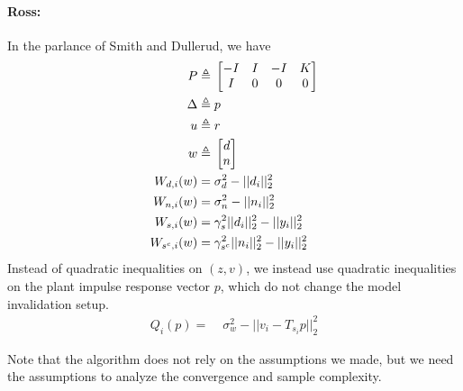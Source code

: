 \documentclass[11pt, onecolumn]{article}
\newcommand{\rb}[1]{{\color{red}{Ross: #1}}}
\begin{document}
\paragraph{Ross:}


\rb{I forget which covariance constraint things we came up with}
In the parlance of Smith and Dullerud, we have
\begin{align*}
P \triangleq &\; \begin{bmatrix}-I & I & -I & K\\I & 0 & 0 & 0\end{bmatrix}\\
\Delta \triangleq &\; p \\
u \triangleq &\; r \\
w \triangleq &\; \begin{bmatrix}d\\n\end{bmatrix}\\
W_{d,i}(w) = &\; \sigma_d^2 - ||d_i||_2^2\\
W_{n,i}(w) = &\; \sigma_n^2 - ||n_i||_2^2\\
W_{s,i}(w) = &\; \gamma_s^2||d_i||_2^2 - ||y_i||_2^2\\
W_{s^c,i}(w) = &\; \gamma_{s^c}^2||n_i||_2^2 - ||y_i||_2^2\\
\end{align*}
Instead of quadratic inequalities on $(z,v)$, we instead use quadratic inequalities on the plant impulse response vector $p$, which do not change the model invalidation setup.
\begin{align*}
Q_i(p) = &\; \sigma_w^2 - ||v_i - T_{s_i}p||_2^2
\end{align*}
\rb{Todo: quadratic equality constraints}

\begin{remark}
  Note that the algorithm does not rely on the assumptions we made, but we need the assumptions to
  analyze the convergence and sample complexity.
\end{remark}
\end{document}
